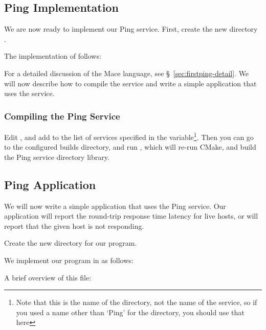\subsection{Ping Implementation}
\label{sec:first-ping-implementation}

We are now ready to implement our Ping service.  First, create the new
directory .

The implementation of  follows:



For a detailed discussion of the Mace language, see
\S~\ref{sec:firstping-detail}.  We will now describe how to
compile the service and write a simple application that uses the
service.

\subsubsection{Compiling the Ping Service}
\label{sec:compiling-ping-m}

Edit , and add  to the
list of services specified in the 
variable\footnote{Note that this is the name of the directory, not the
name of the service, so if you used a name other than `Ping' for the
directory, you should use that here}.  Then you can go to the configured
builds directory, and run , which will re-run CMake,
and build the Ping service directory library.


\subsection{Ping Application}
\label{sec:first-ping-application}

We will now write a simple application that uses the Ping service.
Our application will report the round-trip response time latency for
live hosts, or will report that the given host is not responding.

Create the new directory  for our program.

We implement our program in  as
follows:


A brief overview of this file:

